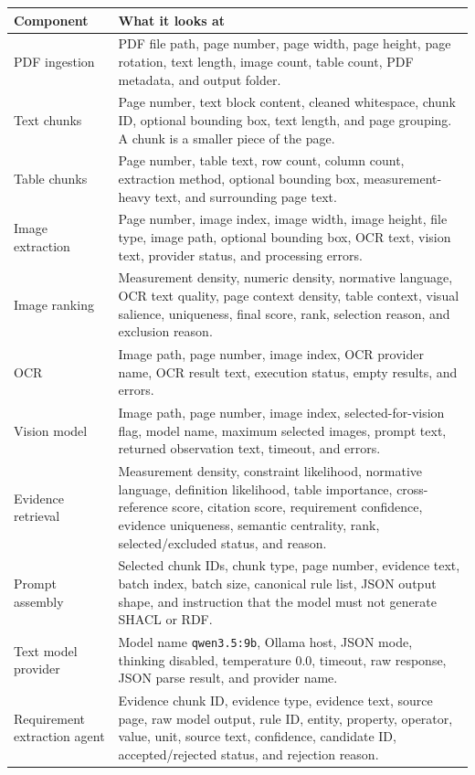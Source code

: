 \documentclass[11pt,a4paper]{article}
\begin{document}
\begin{longtable}{|p{3.8cm}|p{11.3cm}|}
\hline
\textbf{Component} & \textbf{What it looks at} \\
\hline
PDF ingestion &
PDF file path, page number, page width, page height, page rotation, text length, image count, table count, PDF metadata, and output folder. \\
\hline
Text chunks &
Page number, text block content, cleaned whitespace, chunk ID, optional bounding box, text length, and page grouping. A chunk is a smaller piece of the page. \\
\hline
Table chunks &
Page number, table text, row count, column count, extraction method, optional bounding box, measurement-heavy text, and surrounding page text. \\
\hline
Image extraction &
Page number, image index, image width, image height, file type, image path, optional bounding box, OCR text, vision text, provider status, and processing errors. \\
\hline
Image ranking &
Measurement density, numeric density, normative language, OCR text quality, page context density, table context, visual salience, uniqueness, final score, rank, selection reason, and exclusion reason. \\
\hline
OCR &
Image path, page number, image index, OCR provider name, OCR result text, execution status, empty results, and errors. \\
\hline
Vision model &
Image path, page number, image index, selected-for-vision flag, model name, maximum selected images, prompt text, returned observation text, timeout, and errors. \\
\hline
Evidence retrieval &
Measurement density, constraint likelihood, normative language, definition likelihood, table importance, cross-reference score, citation score, requirement confidence, evidence uniqueness, semantic centrality, rank, selected/excluded status, and reason. \\
\hline
Prompt assembly &
Selected chunk IDs, chunk type, page number, evidence text, batch index, batch size, canonical rule list, JSON output shape, and instruction that the model must not generate SHACL or RDF. \\
\hline
Text model provider &
Model name \texttt{qwen3.5:9b}, Ollama host, JSON mode, thinking disabled, temperature 0.0, timeout, raw response, JSON parse result, and provider name. \\
\hline
Requirement extraction agent &
Evidence chunk ID, evidence type, evidence text, source page, raw model output, rule ID, entity, property, operator, value, unit, source text, confidence, candidate ID, accepted/rejected status, and rejection reason. \\

\end{longtable}
\end{document}

